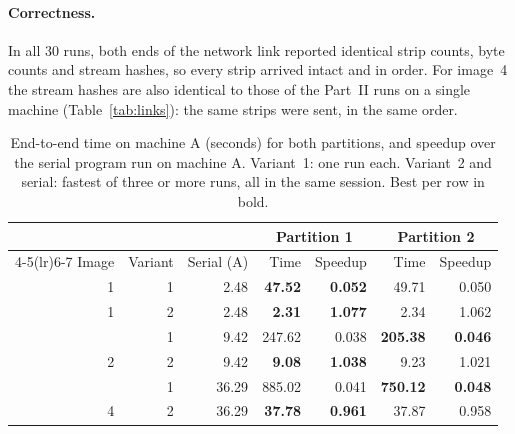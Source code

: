 \documentclass[11pt,a4paper]{article}
\begin{document}
\paragraph{Correctness.} In all 30 runs, both ends of the network link reported identical strip
counts, byte counts and stream hashes, so every strip arrived intact and in order. For image~4 the
stream hashes are also identical to those of the Part~II runs on a single machine
(Table~\ref{tab:links}): the same strips were sent, in the same order.

\begin{table}[htbp]
\centering
\caption{End-to-end time on machine A (seconds) for both partitions, and speedup over the serial
program run on machine A. Variant~1: one run each. Variant~2 and serial: fastest of three or more
runs, all in the same session. Best per row in bold.}
\label{tab:part3}
\begin{tabular}{rr r rr rr}
\toprule
& & & \multicolumn{2}{c}{Partition 1} & \multicolumn{2}{c}{Partition 2} \\
\cmidrule(lr){4-5}\cmidrule(lr){6-7}
Image & Variant & Serial (A) & Time & Speedup & Time & Speedup \\
\midrule
1 & 1 & 2.48 & \textbf{47.52} & \textbf{0.052} & 49.71 & 0.050 \\
1 & 2 & 2.48 & \textbf{2.31} & \textbf{1.077} & 2.34 & 1.062 \\
\addlinespace
2 & 1 & 9.42 & 247.62 & 0.038 & \textbf{205.38} & \textbf{0.046} \\
2 & 2 & 9.42 & \textbf{9.08} & \textbf{1.038} & 9.23 & 1.021 \\
\addlinespace
4 & 1 & 36.29 & 885.02 & 0.041 & \textbf{750.12} & \textbf{0.048} \\
4 & 2 & 36.29 & \textbf{37.78} & \textbf{0.961} & 37.87 & 0.958 \\
\bottomrule
\end{tabular}
\end{table}
\end{document}
